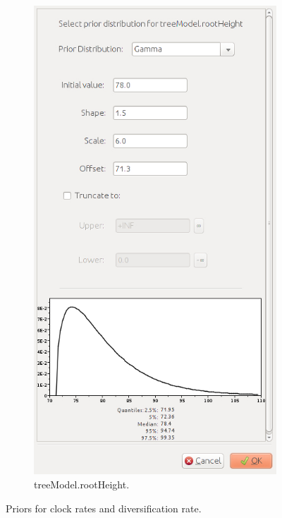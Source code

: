 {\begin{figure}[htbp]
\begin{subfigure}[b]{0.315\textwidth}
            \includegraphics[width=\textwidth]{../screenshots/beauti-prior-root.jpg}
            \caption{treeModel.rootHeight.}
            \label{fig:beautiPriorsRoot}
        \end{subfigure}
        \caption{Priors for clock rates and diversification rate.}
        \label{fig:beautiPriorsClocks}
    \end{figure}

}
